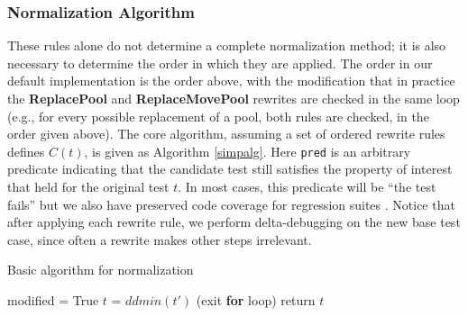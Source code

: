 \subsubsection{Normalization Algorithm}
\label{formalexample}

These rules alone do not determine a complete normalization method; it is
also necessary to determine the order in which they are applied.  The
order in our default implementation is the order above, with the
modification that in practice the {\bf ReplacePool} and {\bf
  ReplaceMovePool} rewrites are checked in the same loop
(e.g., for every possible replacement of a pool, both rules are
checked, in the order given above).  The core algorithm, assuming a set
of ordered rewrite rules defines $C(t)$, is given as Algorithm
\ref{simpalg}.  Here {\tt pred} is an arbitrary predicate indicating
that the candidate test still satisfies the property of interest that
held for the original test $t$.  In most cases, this predicate will be
``the test fails'' but we also have preserved
code coverage for regression suites \cite{icst2014}.  Notice that
after applying each rewrite rule, we perform delta-debugging on the
new base test case, since often a rewrite makes other steps irrelevant.

\begin{algorithm}
\caption{Basic algorithm for normalization}
\label{simpalg}
\begin{algorithmic}[1]
\State modified = True 
\State $t$ = $ddmin(t')$
 (exit {\bf for} loop) 
\EndIf 
\EndFor 
\EndWhile 
\State return $t$
\end{algorithmic}
\end{algorithm}

